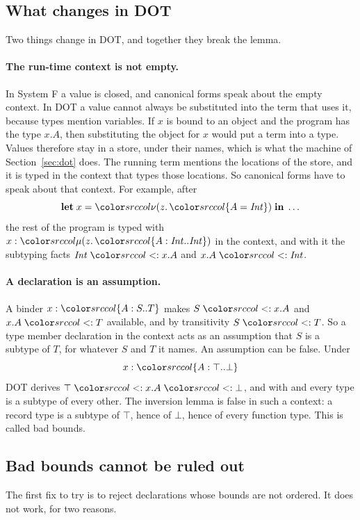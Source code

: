 \subsection{What changes in DOT}

Two things change in DOT, and together they break the lemma.

\paragraph{The run-time context is not empty.}
In System F a value is closed, and canonical forms speak about the empty context. In DOT a value cannot always be substituted into the term that uses it, because types mention variables. If $x$ is bound to an object and the program has the type $x.A$, then substituting the object for $x$ would put a term into a type. Values therefore stay in a store, under their names, which is what the machine of Section~\ref{sec:dot} does. The running term mentions the locations of the store, and it is typed in the context that types those locations. So canonical forms have to speak about that context. For example, after
\[
\klet x = \dnew{z}{\ddeftyp{A}{\mathit{Int}}} \kin \ldots
\]
the rest of the program is typed with $x : \dmu{z}{\dtyp{A}{\mathit{Int}}{\mathit{Int}}}$ in the context, and with it the subtyping facts $\mathit{Int} \sub x.A$ and $x.A \sub \mathit{Int}$.

\paragraph{A declaration is an assumption.}
A binder $x : \dtyp{A}{S}{T}$ makes $S \sub x.A$ and $x.A \sub T$ available, and by transitivity $S \sub T$. So a type member declaration in the context acts as an assumption that $S$ is a subtype of $T$, for whatever $S$ and $T$ it names. An assumption can be false. Under
\[
x : \dtyp{A}{\top}{\bot}
\]
DOT derives $\top \sub x.A \sub \bot$, and with  and  every type is a subtype of every other. The inversion lemma is false in such a context: a record type is a subtype of $\top$, hence of $\bot$, hence of every function type. This is called bad bounds.

\subsection{Bad bounds cannot be ruled out}

The first fix to try is to reject declarations whose bounds are not ordered. It does not work, for two reasons.

